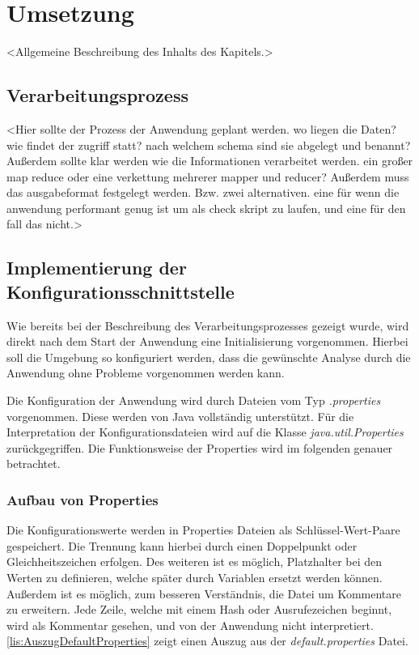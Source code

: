 
\chapter{Umsetzung}\label{cha:Umsetzung}
<Allgemeine Beschreibung des Inhalts des Kapitels.>

\section{Verarbeitungsprozess}
<Hier sollte der Prozess der Anwendung geplant werden. wo liegen die Daten? wie findet der zugriff statt? nach welchem schema sind sie abgelegt und benannt? Außerdem sollte klar werden wie die Informationen verarbeitet werden. ein großer map reduce oder eine verkettung mehrerer mapper und reducer? Außerdem muss das ausgabeformat festgelegt werden. Bzw. zwei alternativen. eine für wenn die anwendung performant genug ist um als check skript zu laufen, und eine für den fall das nicht.>


\section{Implementierung der Konfigurationsschnittstelle}
Wie bereits bei der Beschreibung des Verarbeitungsprozesses gezeigt wurde, wird direkt nach dem Start der Anwendung eine Initialisierung vorgenommen. Hierbei soll die Umgebung so konfiguriert werden, dass die gewünschte Analyse durch die Anwendung ohne Probleme vorgenommen werden kann.

Die Konfiguration der Anwendung wird durch Dateien vom Typ \textit{.properties} vorgenommen. Diese werden von Java vollständig unterstützt. Für die Interpretation der Konfigurationsdateien wird auf die Klasse \textit{java.util.Properties} zurückgegriffen. Die Funktionsweise der Properties wird im folgenden genauer betrachtet.

\subsection{Aufbau von Properties}
Die Konfigurationswerte werden in Properties Dateien als Schlüssel-Wert-Paare gespeichert. Die Trennung kann hierbei durch einen Doppelpunkt oder Gleichheitszeichen erfolgen. Des weiteren ist es möglich, Platzhalter bei den Werten zu definieren, welche später durch Variablen ersetzt werden können. Außerdem ist es möglich, zum besseren Verständnis, die Datei um Kommentare zu erweitern. Jede Zeile, welche mit einem Hash oder Ausrufezeichen beginnt, wird als Kommentar gesehen, und von der Anwendung nicht interpretiert. \autoref{lis:AuszugDefaultProperties} zeigt einen Auszug aus der \textit{default.properties} Datei. \\

